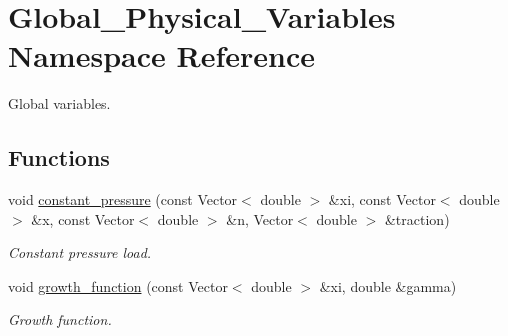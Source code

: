 \hypertarget{namespaceGlobal__Physical__Variables}{}\section{Global\+\_\+\+Physical\+\_\+\+Variables Namespace Reference}
\label{namespaceGlobal__Physical__Variables}


Global variables.  


\subsection*{Functions}
\begin{DoxyCompactItemize}
\item 
void \hyperlink{namespaceGlobal__Physical__Variables_a19f4e20a92e7d216b4d2b00308f96917}{constant\+\_\+pressure} (const Vector$<$ double $>$ \&xi, const Vector$<$ double $>$ \&x, const Vector$<$ double $>$ \&n, Vector$<$ double $>$ \&traction)
\begin{DoxyCompactList}\small\item\em Constant pressure load. \end{DoxyCompactList}\item 
void \hyperlink{namespaceGlobal__Physical__Variables_a6be3760e5494b1772e4bfe5d5f3c5d53}{growth\+\_\+function} (const Vector$<$ double $>$ \&xi, double \&gamma)
\begin{DoxyCompactList}\small\item\em Growth function. \end{DoxyCompactList}\end{DoxyCompactItemize}
